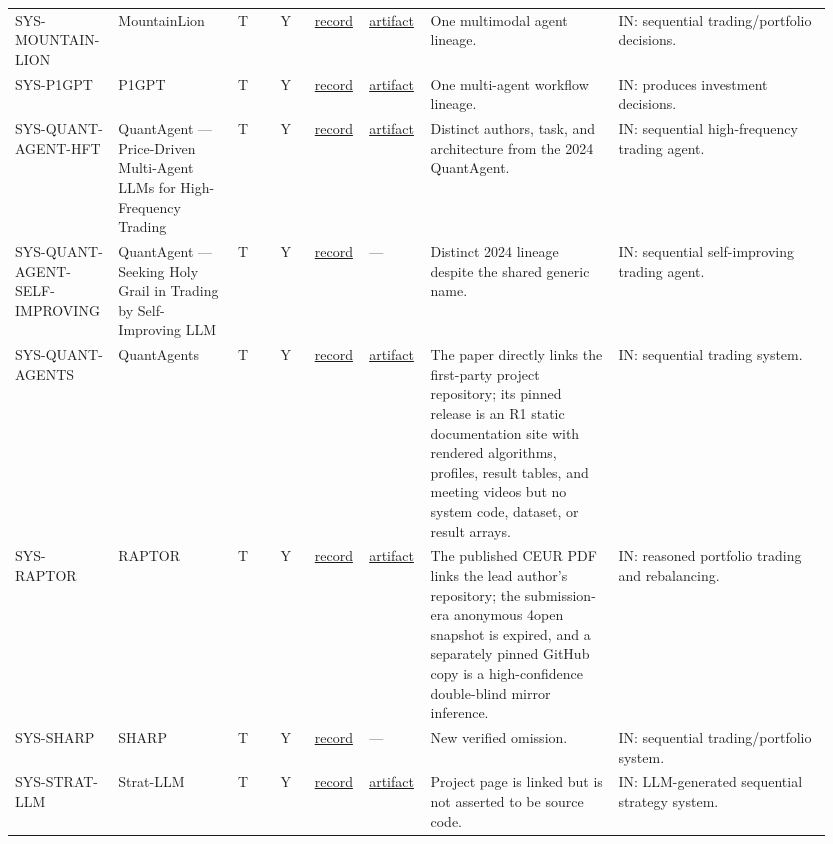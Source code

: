 \begin{longtable}{@{}L{0.12\linewidth}L{0.14\linewidth}L{0.05\linewidth}L{0.04\linewidth}L{0.06\linewidth}L{0.07\linewidth}L{0.22\linewidth}L{0.25\linewidth}@{}}
SYS-\allowbreak{}MOUNTAIN-\allowbreak{}LION & MountainLion & T & Y & \href{https://arxiv.org/abs/2507.20474}{record} & \href{https://github.com/MountainLionAi/GenAI-Platform}{artifact} & One multimodal agent lineage. & IN: sequential trading/portfolio decisions. \\
SYS-\allowbreak{}P1GPT & P1GPT & T & Y & \href{https://arxiv.org/abs/2510.23032}{record} & \href{https://github.com/P1GPT/web\_demo}{artifact} & One multi-agent workflow lineage. & IN: produces investment decisions. \\
SYS-\allowbreak{}QUANT-\allowbreak{}AGENT-\allowbreak{}HFT & QuantAgent — Price-Driven Multi-Agent LLMs for High-Frequency Trading & T & Y & \href{https://arxiv.org/abs/2509.09995}{record} & \href{https://github.com/Y-Research-SBU/QuantAgent}{artifact} & Distinct authors, task, and architecture from the 2024 QuantAgent. & IN: sequential high-frequency trading agent. \\
SYS-\allowbreak{}QUANT-\allowbreak{}AGENT-\allowbreak{}SELF-\allowbreak{}IMPROVING & QuantAgent — Seeking Holy Grail in Trading by Self-Improving LLM & T & Y & \href{https://arxiv.org/abs/2402.03755}{record} & --- & Distinct 2024 lineage despite the shared generic name. & IN: sequential self-improving trading agent. \\
SYS-\allowbreak{}QUANT-\allowbreak{}AGENTS & QuantAgents & T & Y & \href{https://arxiv.org/abs/2510.04643}{record} & \href{https://github.com/QuantAgents/quantagents.github.io}{artifact} & The paper directly links the first-party project repository; its pinned release is an R1 static documentation site with rendered algorithms, profiles, result tables, and meeting videos but no system code, dataset, or result arrays. & IN: sequential trading system. \\
SYS-\allowbreak{}RAPTOR & RAPTOR & T & Y & \href{https://openreview.net/forum?id=ziuTkKhgT0}{record} & \href{https://github.com/blakealmon/AI-Hedge-Fund-Driven-By-Multi-Agent-LLM-Based-Architecture}{artifact} & The published CEUR PDF links the lead author's repository; the submission-era anonymous 4open snapshot is expired, and a separately pinned GitHub copy is a high-confidence double-blind mirror inference. & IN: reasoned portfolio trading and rebalancing. \\
SYS-\allowbreak{}SHARP & SHARP & T & Y & \href{https://arxiv.org/abs/2605.06822}{record} & --- & New verified omission. & IN: sequential trading/portfolio system. \\
SYS-\allowbreak{}STRAT-\allowbreak{}LLM & Strat-LLM & T & Y & \href{https://arxiv.org/abs/2605.06024}{record} & \href{https://Strat-LLM.github.io}{artifact} & Project page is linked but is not asserted to be source code. & IN: LLM-generated sequential strategy system. \\

\end{longtable}
